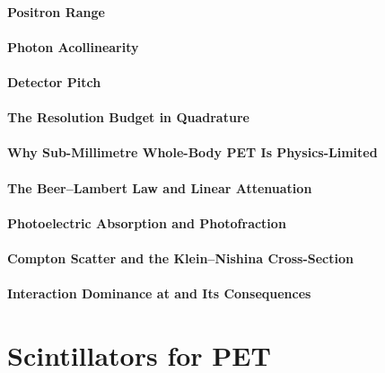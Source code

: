\paragraph{Positron Range}

\paragraph{Photon Acollinearity}

\paragraph{Detector Pitch}

\paragraph{The Resolution Budget in Quadrature}

\paragraph{Why Sub-Millimetre Whole-Body PET Is Physics-Limited}

\paragraph{The Beer--Lambert Law and Linear Attenuation}

\paragraph{Photoelectric Absorption and Photofraction}

\paragraph{Compton Scatter and the Klein--Nishina Cross-Section}

\paragraph{Interaction Dominance at  and Its Consequences}

\section{Scintillators for PET}
\label{sec:scintillators}


